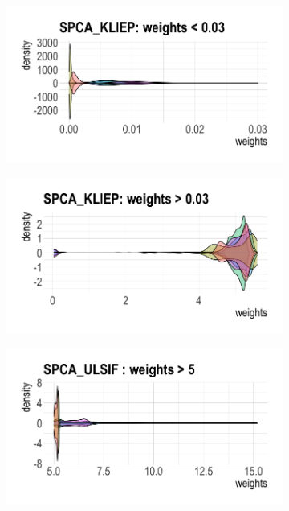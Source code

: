 \documentclass[a4paper,12pt]{article}
\begin{document}
\begin{figure}[H]
\begin{subfigure}{.32\textwidth}
  \label{fig:sfig2}
\end{subfigure} 
\begin{subfigure}{.32\textwidth}
  \centering
  \includegraphics[width=\linewidth]{bio3.png}
  \label{fig:sfig1}
\end{subfigure}
\begin{subfigure}{.32\textwidth}
  \centering
  \includegraphics[width=\linewidth]{bio4.png}
  \label{fig:sfig2}
\end{subfigure} 
\begin{subfigure}{.32\textwidth}
  \centering
  \includegraphics[width=\linewidth]{bio5.png}

\end{subfigure}
\end{figure}
\end{document}
